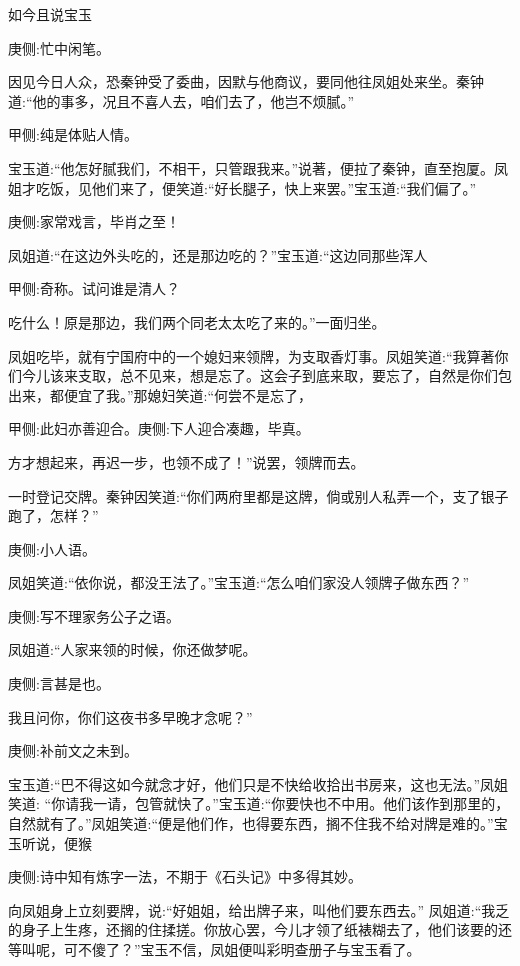 \begin{parag}
    如今且说宝玉\begin{note}庚侧:忙中闲笔。\end{note}因见今日人众，恐秦钟受了委曲，因默与他商议，要同他往凤姐处来坐。秦钟道:“他的事多，况且不喜人去，咱们去了，他岂不烦腻。”\begin{note}甲侧:纯是体贴人情。\end{note}宝玉道:“他怎好腻我们，不相干，只管跟我来。”说著，便拉了秦钟，直至抱厦。凤姐才吃饭，见他们来了，便笑道:“好长腿子，快上来罢。”宝玉道:“我们偏了。”\begin{note}庚侧:家常戏言，毕肖之至！\end{note}凤姐道:“在这边外头吃的，还是那边吃的？”宝玉道:“这边同那些浑人\begin{note}甲侧:奇称。试问谁是清人？\end{note}吃什么！原是那边，我们两个同老太太吃了来的。”一面归坐。
\end{parag}


\begin{parag}
    凤姐吃毕，就有宁国府中的一个媳妇来领牌，为支取香灯事。凤姐笑道:“我算著你们今儿该来支取，总不见来，想是忘了。这会子到底来取，要忘了，自然是你们包出来，都便宜了我。”那媳妇笑道:“何尝不是忘了，\begin{note}甲侧:此妇亦善迎合。庚侧:下人迎合凑趣，毕真。\end{note}方才想起来，再迟一步，也领不成了！”说罢，领牌而去。
\end{parag}


\begin{parag}
    一时登记交牌。秦钟因笑道:“你们两府里都是这牌，倘或别人私弄一个，支了银子跑了，怎样？”\begin{note}庚侧:小人语。\end{note}凤姐笑道:“依你说，都没王法了。”宝玉道:“怎么咱们家没人领牌子做东西？”\begin{note}庚侧:写不理家务公子之语。\end{note}凤姐道:“人家来领的时候，你还做梦呢。\begin{note}庚侧:言甚是也。\end{note}我且问你，你们这夜书多早晚才念呢？”\begin{note}庚侧:补前文之未到。\end{note}宝玉道:“巴不得这如今就念才好，他们只是不快给收拾出书房来，这也无法。”凤姐笑道: “你请我一请，包管就快了。”宝玉道:“你要快也不中用。他们该作到那里的，自然就有了。”凤姐笑道:“便是他们作，也得要东西，搁不住我不给对牌是难的。”宝玉听说，便猴\begin{note}庚侧:诗中知有炼字一法，不期于《石头记》中多得其妙。\end{note}向凤姐身上立刻要牌，说:“好姐姐，给出牌子来，叫他们要东西去。” 凤姐道:“我乏的身子上生疼，还搁的住揉搓。你放心罢，今儿才领了纸裱糊去了，他们该要的还等叫呢，可不傻了？”宝玉不信，凤姐便叫彩明查册子与宝玉看了。
\end{parag}


